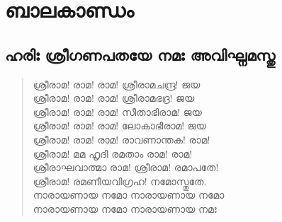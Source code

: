 \chapter{ബാലകാണ്ഡം}

\section{ഹരിഃ ശ്രീഗണപതയേ നമഃ അവിഘ്നമസ്തു}

\begin{verse}
ശ്രീരാമ! രാമ! രാമ! ശ്രീരാമചന്ദ്ര! ജയ\\
ശ്രീരാമ! രാമ! രാമ! ശ്രീരാമഭദ്ര! ജയ\\
ശ്രീരാമ! രാമ! രാമ! സീതാഭിരാമ! ജയ\\
ശ്രീരാമ! രാമ! രാമ! ലോകാഭിരാമ! ജയ\\
ശ്രീരാമ! രാമ! രാമ! രാവണാന്തക! രാമ!\\
ശ്രീരാമ! മമ ഹൃദി രമതാം രാമ! രാമ!\\
ശ്രീരാഘവാത്മാ രാമ! ശ്രീരാമ! രമാപതേ!\\
ശ്രീരാമ! രമണീയവിഗ്രഹ! നമോസ്തുതേ.\\
നാരായണായ നമോ നാരായണായ നമോ\\
നാരായണായ നമോ നാരായണായ നമഃ
\end{verse}

